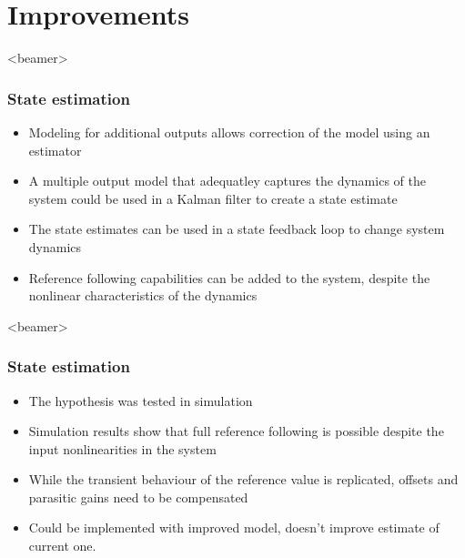 \section{Improvements}
\begin{frame}<beamer>
\frametitle{State estimation}
  \begin{itemize}
    \item Modeling for additional outputs allows correction of the model using an estimator
    \item  A multiple output model that adequatley captures the dynamics of the system could be used in a Kalman filter to create a state estimate
    \item The state estimates can be used in a state feedback loop to change system dynamics
    \item Reference following capabilities can be added to the system, despite the nonlinear characteristics of the dynamics
  \end{itemize}
\end{frame}

\begin{frame}<beamer>
\frametitle{State estimation}
  \begin{itemize}
    \item The hypothesis was tested in simulation
    \item Simulation results show that full reference following is possible despite the input nonlinearities in the system
    \item While the transient behaviour of the reference value is replicated, offsets and parasitic gains need to be compensated
    \item Could be implemented with improved model, doesn't improve estimate of current one.
    \end{itemize}
\end{frame}